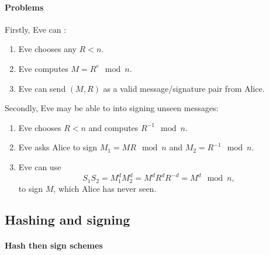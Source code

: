 \documentclass[a4paper, 11pt, openany]{book}
\begin{document}
\paragraph{Problems}

Firstly, Eve can :
\begin{enumerate}
    \item Eve chooses any $R < n$.

    \item Eve computes $M = R^e \mod n$.

    \item Eve can send $(M,R)$ as a valid message/signature pair from Alice.
\end{enumerate}

Secondly, Eve may be able to  into signing unseen messages:
\begin{enumerate}
    \item Eve chooses $R < n$ and computes $R^{-1} \mod n$.

    \item Eve asks Alice to sign $M_1 = MR \mod n$ and $M_2 = R^{-1} \mod n$.

    \item Eve can use
    \[
        S_1S_2 = M_1^d M_2^d = M^d R^d R^{-d} = M^d \mod n,
    \]
    to sign $M$, which Alice has never seen.
\end{enumerate}






\subsection{Hashing and signing}

\paragraph{Hash then sign schemes}
\end{document}
